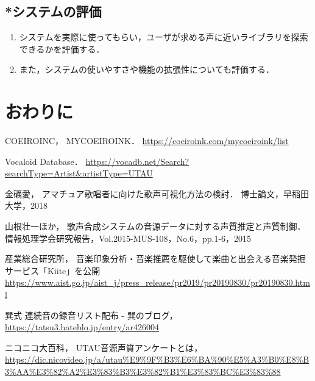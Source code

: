 \documentclass[a4j,8pt,twocolumn]{extarticle}
\begin{document}
\subsection{*システムの評価}
\begin{enumerate}
  \item システムを実際に使ってもらい，ユーザが求める声に近いライブラリを探索できるかを評価する．
  \item また，システムの使いやすさや機能の拡張性についても評価する．
\end{enumerate}

\section{おわりに}

\begin{thebibliography}{9}
COEIROINC，
MYCOEIROINK．
\url{https://coeiroink.com/mycoeiroink/list}

Vocaloid Database．
\url{https://vocadb.net/Search?searchType=Artist&artistType=UTAU}

金礪愛，
アマチュア歌唱者に向けた歌声可視化方法の検討．
博士論文，早稲田大学，2018

山根壮一ほか，
歌声合成システムの音源データに対する声質推定と声質制御．
情報処理学会研究報告，Vol.2015-MUS-108，No.6，pp.1-6，2015

産業総合研究所，
音楽印象分析・音楽推薦を駆使して楽曲と出会える音楽発掘サービス「Kiite」を公開
\url{https://www.aist.go.jp/aist_j/press_release/pr2019/pr20190830/pr20190830.html}

巽式 連続音の録音リスト配布 - 巽のブログ，
\url{https://tatsu3.hateblo.jp/entry/ar426004}

ニコニコ大百科，
UTAU音源声質アンケートとは，
\url{https://dic.nicovideo.jp/a/utau%E9%9F%B3%E6%BA%90%E5%A3%B0%E8%B3%AA%E3%82%A2%E3%83%B3%E3%82%B1%E3%83%BC%E3%83%88}

\end{thebibliography}


\end{document}
